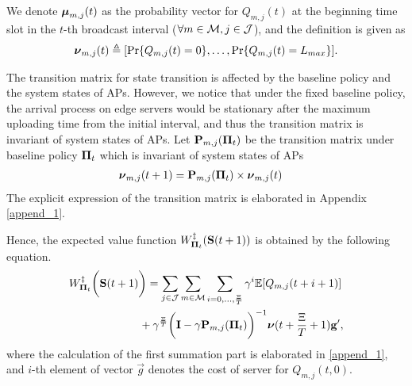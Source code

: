 \begin{lemma}
    We denote $\boldsymbol{\mu}_{m,j}(t)$ as the probability vector for $Q_{m,j}(t)$ at the beginning time slot in the $t$-th broadcast interval ($\forall m\in\mathcal{M}, j\in\mathcal{J}$), and the definition is given as
    \begin{align}
        \boldsymbol{\nu}_{m,j}(t) \triangleq [\Pr\{Q_{m,j}(t)=0\}, \dots, \Pr\{Q_{m,j}(t)=L_{max}\}].
    \end{align}

    The transition matrix for state transition is affected by the baseline policy and the system states of APs.
    However, we notice that under the fixed baseline policy, the arrival process on edge servers would be stationary after the maximum uploading time from the initial interval, and thus the transition matrix is invariant of system states of APs.
    Let $\mathbf{P}_{m,j}(\boldsymbol{\Pi}_{t})$ be the transition matrix under baseline policy $\boldsymbol{\Pi}_{t}$ which is invariant of system states of APs
    \begin{align}
        \boldsymbol{\nu}_{m,j}(t+1) &= \mathbf{P}_{m,j}(\boldsymbol{\Pi}_{t}) \times \boldsymbol{\nu}_{m,j}(t)
    \end{align}
    The explicit expression of the transition matrix is elaborated in Appendix \ref{append_1}.

    Hence, the expected value function $W^{\ddagger}_{\boldsymbol{\Pi}_{t}}(\mathbf{S}(t+1))$ is obtained by the following equation.
    {\small
    \begin{align}
        &W^{\ddagger}_{\boldsymbol{\Pi}_{t}}\bigg(\mathbf{S}(t+1)\bigg)
        = \sum_{j\in\mathcal{J}}\sum_{m\in\mathcal{M}}\sum_{i=0,\dots,\frac{\Xi}{T}} \gamma^{i} \mathbb{E}[ Q_{m,j}({t+i+1}) ]
        \nonumber\\
        &~~~~~~~~~~~~~~~~~~~+ \gamma^{\frac{\Xi}{T}} \bigg( \mathbf{I} - \gamma \mathbf{P}_{m,j}(\boldsymbol{\Pi}_{t}) \bigg)^{-1} \boldsymbol{\nu}({t+\frac{\Xi}{T}+1}) \mathbf{g}',
    \end{align}   
    }
    where the calculation of the first summation part is elaborated in \ref{append_1}, and $i$-th element of vector $\vec{g}$ denotes the cost of server for $Q_{m,j}(t,0)$.
\end{lemma}

